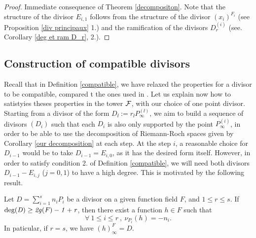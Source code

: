\documentclass[10pt]{article}
\begin{document}
\s

\begin{proof}
Immediate consequence of Theorem \ref{decompositon}. Note that the structure of the divisor $E_{i,1}$ follows from the structure of the divisor $(x_i)^{F_i}$ (see Proposition \ref{div principaux} 1.) and the ramification of the divisors $D_r^{(i)}$ (see. Corollary \ref{deg et ram D_r}, 2.). 
\end{proof}

\s

\subsection{Construction of compatible divisors}

\s

Recall that in Definition \ref{compatible}, we have relaxed the properties for a divisor to be compatible, compared t the ones used in \cite{IOPP}. Let us explain now how to satistyies theses properties in the tower $\mathcal{F}$, with our choice of one point divisor. \\
Starting from a divisor of the form $D_{\ii} := r_{\ii}P_{\infty}^{(\ii)}$, we aim to build a sequence of divisors $(D_i)$ such that each $D_i$ is also only supported by the point $P_{\infty}^{(i)}$, in order to be able to use the decomposition of Riemann-Roch spaces given by Corollary \ref{our decomposition} at each step. At the step $i$, a reasonable choice for $D_{i-1}$ would be to take $D_{i-1} = E_{i,0}$, as it has the desired form itself. However, in order to satisfy condition 2. of Definition \ref{compatible}, we will need both divisors $D_{i-1}-E_{i,j}$ ($j=0,1$) to have a high degree. This is motivated by the following result.

\s

\begin{proposition} \label{hugues' result}
Let $D = \sum\limits_{i=1}^s n_iP_i$ be a divisor on a given function field $F$, and $1 \leq r \leq s$. If $\rm deg \it (D) \geq 2g(F)-1+r$, then there exist a function $h \in F$ such that 
\[\forall \ 1 \leq i \leq r \ , \ \nu_{P_i}(h) = -n_i.\]
In paticular, if $r=s$, we have $(h)^F_{\infty} = D$.
\end{proposition}

\s
\end{document}
